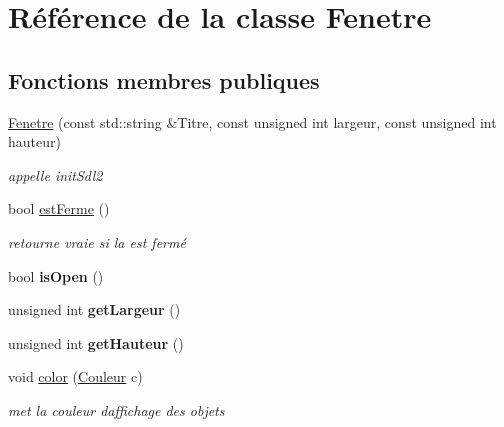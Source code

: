\hypertarget{class_fenetre}{}\section{Référence de la classe Fenetre}
\label{class_fenetre}
\subsection*{Fonctions membres publiques}
\begin{DoxyCompactItemize}
\item 
\mbox{\hyperlink{class_fenetre_a532a304e0c331e9e9fad1fe8b4218a96}{Fenetre}} (const std\+::string \&Titre, const unsigned int largeur, const unsigned int hauteur)
\begin{DoxyCompactList}\small\item\em appelle init\+Sdl2 \end{DoxyCompactList}\item 
\mbox{\label{class_fenetre_a5fc27ac2951202e28884a530f8be4074}} 
bool \mbox{\hyperlink{class_fenetre_a5fc27ac2951202e28884a530f8be4074}{est\+Ferme}} ()
\begin{DoxyCompactList}\small\item\em retourne vraie si la est fermé \end{DoxyCompactList}\item 
\mbox{\label{class_fenetre_acccbffabacb01f96b3e246c0b586f493}} 
bool {\bfseries is\+Open} ()
\item 
\mbox{\label{class_fenetre_a8dcb43a897c9f8b262f7d875bf8cb213}} 
unsigned int {\bfseries get\+Largeur} ()
\item 
\mbox{\label{class_fenetre_ae3fe2005d680e693f08d776bd27ef92c}} 
unsigned int {\bfseries get\+Hauteur} ()
\item 
\mbox{\label{class_fenetre_aedde429fa972890645f015a504c7f7b9}} 
void \mbox{\hyperlink{class_fenetre_aedde429fa972890645f015a504c7f7b9}{color}} (\mbox{\hyperlink{class_couleur}{Couleur}} c)
\begin{DoxyCompactList}\small\item\em met la couleur d\textquotesingle{}affichage des objets \end{DoxyCompactList}\item 

\end{DoxyCompactItemize}
